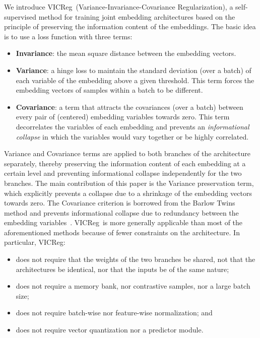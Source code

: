 \documentclass{article}
\newcommand{\algo}{VICReg}
\begin{document}
We introduce \algo \ (Variance-Invariance-Covariance Regularization), a self-supervised method for training joint embedding architectures based on the principle of preserving the information content of the embeddings. 
The basic idea is to use a loss function with three terms:
\begin{itemize}
    \item {\bf Invariance}: the mean square distance between the embedding vectors.
    \item {\bf Variance}: a hinge loss to maintain the standard deviation (over a batch) of each variable of the embedding above a given threshold. This term forces the embedding vectors of samples within a batch to be different.
    \item {\bf Covariance}: a term that attracts the covariances (over a batch) between every pair of (centered) embedding variables towards zero. This term decorrelates the variables of each embedding and prevents an {\em informational collapse} in which the variables would vary together or be highly correlated.
\end{itemize}
Variance and Covariance terms are applied to both branches of the architecture separately, thereby preserving the information content of each embedding at a certain level and preventing informational collapse independently for the two branches.
The main contribution of this paper is the Variance preservation term, which explicitly prevents a collapse due to a shrinkage of the embedding vectors towards zero.
The Covariance criterion is borrowed from the Barlow Twins method and prevents informational collapse due to redundancy between the embedding variables~\cite{zbontar2021barlow}. \algo \ is more generally applicable than most of the aforementioned methods because of fewer constraints on the architecture. In particular, \algo :
\begin{itemize}
    \item does not require that the weights of the two branches be shared, not that the architectures be identical, nor that the inputs be of the same nature;
    \item does not require a memory bank, nor contrastive samples, nor a large batch size;
    \item does not require batch-wise nor feature-wise normalization; and
    \item does not require vector quantization nor a predictor module.
\end{itemize}
\end{document}
